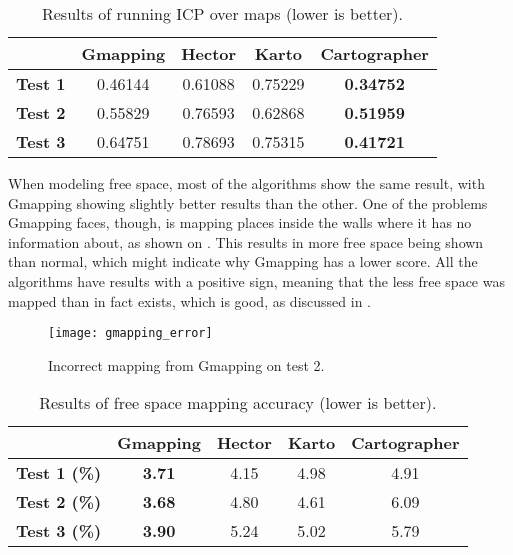 \begin{table}[!ht]
\centering
\renewcommand*{\arraystretch}{1.1}
\begin{tabular}{c|c|c|c|c}
& \textbf{Gmapping} & \textbf{Hector} & \textbf{Karto} & \textbf{Cartographer} \\ \hline
\textbf{Test 1} & 0.46144 & 0.61088 & 0.75229 & \textbf{0.34752} \\
\textbf{Test 2} & 0.55829 & 0.76593 & 0.62868 & \textbf{0.51959} \\
\textbf{Test 3} & 0.64751 & 0.78693 & 0.75315 & \textbf{0.41721} \\
 \hline
\end{tabular}
\caption{Results of running ICP over maps (lower is better).}
\label{tab:results_icp}
\end{table}

When modeling free space, most of the algorithms show the same result, with Gmapping showing slightly better results than the other. One of the problems Gmapping faces, though, is mapping places inside the walls where it has no information about, as shown on . This results in more free space being shown than normal, which might indicate why Gmapping has a lower score. All the algorithms have results with a positive sign, meaning that the less free space was mapped than in fact exists, which is good, as discussed in .

\begin{figure}[!ht]
     \centering
     \texttt{[image: gmapping\_error]}
     \caption{Incorrect mapping from Gmapping on test 2.}
     \label{fig:gmapping_error}
\end{figure}

\begin{table}[!ht]
\centering
\renewcommand*{\arraystretch}{1.1}
\begin{tabular}{c|c|c|c|c}
& \textbf{Gmapping} & \textbf{Hector} & \textbf{Karto} & \textbf{Cartographer} \\ \hline
\textbf{Test 1 (\%)} & \textbf{3.71} & 4.15 & 4.98 & 4.91 \\
\textbf{Test 2 (\%)} & \textbf{3.68} & 4.80 & 4.61 & 6.09 \\
\textbf{Test 3 (\%)} & \textbf{3.90} & 5.24 & 5.02 & 5.79 \\
 \hline
\end{tabular}
\caption{Results of free space mapping accuracy (lower is better).}
\label{tab:results_whitespace}
\end{table}

